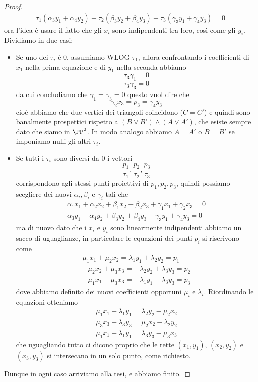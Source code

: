 \documentclass[11pt]{scrartcl}
\begin{document}
\begin{proof}
\begin{gather*}
   	 		\tau_1\left(\alpha_3y_1+\alpha_4y_2\right)+\tau_2\left(\beta_3y_2+\beta_4y_3\right)+\tau_3\left(\gamma_3y_1+\gamma_4y_3\right)=0
   	 	\end{gather*}
   	 	ora l'idea è usare il fatto che gli $x_i$ sono indipendenti tra loro, così come gli $y_i$. Dividiamo in due casi:
   	 	\begin{itemize}
   	 		\item Se uno dei $\tau_i$ è $0$, assumiamo WLOG $\tau_1$, allora confrontando i coefficienti di $x_1$ nella prima equazione e di $y_1$ nella seconda abbiamo 
   	 		$$\tau_3\gamma_1=0$$
   	 		$$\tau_3\gamma_3=0$$
   	 		da cui concludiamo che $\gamma_1=\gamma_3=0$ questo vuol dire che 
   	 		$$\gamma_2x_3=p_3=\gamma_4y_3$$
   	 		cioè abbiamo che due vertici dei triangoli coincidono ($C=C'$) e quindi sono banalmente prospettici rispetto a $(B\lor B')\land (A\lor A')$, che esiste sempre dato che siamo in $\PP^2$. In modo analogo abbiamo $A=A'$ o $B=B'$ se imponiamo nulli gli altri $\tau_i$.
   	 		\item Se tutti i $\tau_i$ sono diversi da $0$ i vettori 
   	 		$$\frac{p_1}{\tau_1},\frac{p_2}{\tau_2},\frac{p_3}{\tau_3}$$
   	 		corrispondono agli stessi punti proiettivi di $p_1,p_2,p_3$, quindi possiamo scegliere dei nuovi $\alpha_i,\beta_i$ e $\gamma_i$ tali che
   	 		\begin{gather*}
   	 			\alpha_1x_1+\alpha_2x_2+\beta_1x_2+\beta_2x_3+\gamma_1x_1+\gamma_2x_3=0 \\
   	 			\alpha_3y_1+\alpha_4y_2+\beta_3y_2+\beta_4y_3+\gamma_3y_1+\gamma_4y_3=0
   	 		\end{gather*}
   	 		ma di nuovo dato che i $x_i$ e $y_i$ sono linearmente indipendenti abbiamo un sacco di uguaglianze, in particolare le equazioni dei punti $p_i$ si riscrivono come
   	 		\begin{gather*}
   	 			\mu_1x_1+\mu_2x_2=\lambda_1y_1+\lambda_2y_2=p_1 \\
   	 			-\mu_2x_2+\mu_3x_3=-\lambda_2y_2+\lambda_3y_3=p_2 \\
   	 			-\mu_1x_1-\mu_3x_3=-\lambda_1y_1-\lambda_3y_3=p_3
   	 		\end{gather*}
   	 		dove abbiamo definito dei nuovi coefficienti opportuni $\mu_i$ e $\lambda_i$. Riordinando le equazioni otteniamo
   	 		\begin{gather*}
   	 			\mu_1x_1-\lambda_1y_1=\lambda_2y_2-\mu_2x_2 \\
   	 			\mu_3x_3-\lambda_3y_3=\mu_2x_2-\lambda_2y_2 \\
   	 			\mu_1x_1-\lambda_1y_1=\lambda_3y_3-\mu_3x_3
   	 		\end{gather*}
   	 		che uguagliando tutto ci dicono proprio che le rette $(x_1,y_1)$, $(x_2,y_2)$ e $(x_3,y_3)$ si intersecano in un solo punto, come richiesto.
   	 	\end{itemize}
   	 	Dunque in ogni caso arriviamo alla tesi, e abbiamo finito.
   	 \end{proof}
\end{document}
